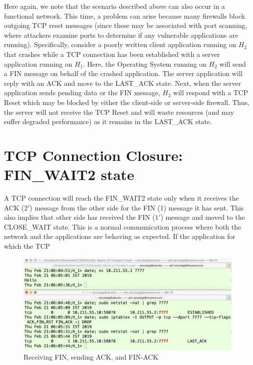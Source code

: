 \begin{multicols}{2}
Here again, we note that the scenario described above can also occur in a functional network. This time, a problem can arise because many firewalls block outgoing TCP reset messages (since these may be associated with port scanning, where attackers examine ports to determine if any vulnerable applications are running). Specifically, consider a poorly written client application running on $H_{2}$ that crashes while a TCP connection has been established with a server application running on $H_{1}$. Here, the Operating System running on $H_{2}$ will send a FIN message on behalf of the crashed application. The server application will reply with an ACK and move to the LAST\_ACK state. Next, when the server application sends pending data or the FIN message, $H_{2}$ will respond with a TCP Reset which may be blocked by either the client-side or server-side firewall. Thus, the server will not receive the TCP Reset and will waste resources (and may suffer degraded performance) as it remains in the LAST\_ACK state.

\section{TCP Connection Closure:\\ FIN\_WAIT2 state}

{\parfillskip=0pt
A TCP connection will reach the FIN\_WAIT2 state only when it receives the ACK ($2'$) message from the other side for the FIN (1) message it has sent. This also implies that other side has received the FIN ($1'$) message and moved to the CLOSE\_WAIT state. This is a normal communication process where both the network and the applications are behaving as expected. If the application for which the TCP\par}
\end{multicols}

\begin{figure}[!htb]
\centering
\includegraphics[scale=.22]{src/Figures/chap3/10.jpg}
\caption{Receiving FIN, sending ACK, and FIN-ACK}\label{chap3-fig10}
\end{figure}

